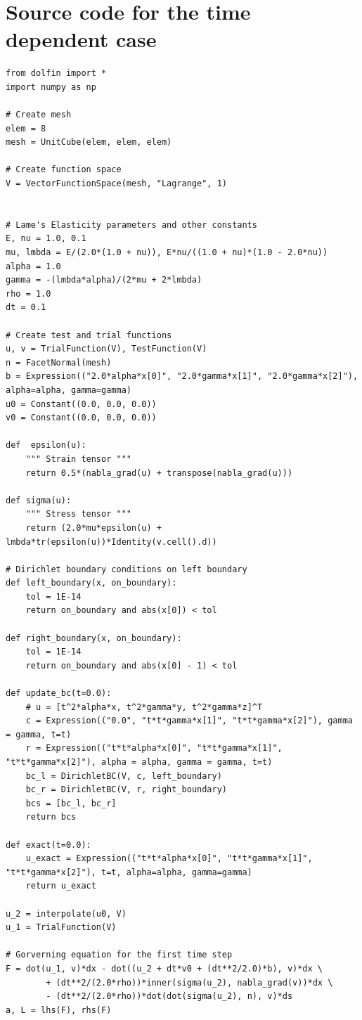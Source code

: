 \documentclass[twoside]{article}
\begin{document}
\section{Source code for the time dependent case}
\label{time}
\begin{lstlisting}
from dolfin import *
import numpy as np

# Create mesh
elem = 8
mesh = UnitCube(elem, elem, elem)

# Create function space
V = VectorFunctionSpace(mesh, "Lagrange", 1)


# Lame's Elasticity parameters and other constants
E, nu = 1.0, 0.1
mu, lmbda = E/(2.0*(1.0 + nu)), E*nu/((1.0 + nu)*(1.0 - 2.0*nu))
alpha = 1.0
gamma = -(lmbda*alpha)/(2*mu + 2*lmbda)
rho = 1.0
dt = 0.1

# Create test and trial functions
u, v = TrialFunction(V), TestFunction(V)
n = FacetNormal(mesh)
b = Expression(("2.0*alpha*x[0]", "2.0*gamma*x[1]", "2.0*gamma*x[2]"), alpha=alpha, gamma=gamma)
u0 = Constant((0.0, 0.0, 0.0))
v0 = Constant((0.0, 0.0, 0.0))

def  epsilon(u):
	""" Strain tensor """
	return 0.5*(nabla_grad(u) + transpose(nabla_grad(u)))

def sigma(u):
	""" Stress tensor """
	return (2.0*mu*epsilon(u) + lmbda*tr(epsilon(u))*Identity(v.cell().d))

# Dirichlet boundary conditions on left boundary
def left_boundary(x, on_boundary):
	tol = 1E-14
	return on_boundary and abs(x[0]) < tol

def right_boundary(x, on_boundary):
	tol = 1E-14
	return on_boundary and abs(x[0] - 1) < tol

def update_bc(t=0.0):
	# u = [t^2*alpha*x, t^2*gamma*y, t^2*gamma*z]^T
	c = Expression(("0.0", "t*t*gamma*x[1]", "t*t*gamma*x[2]"), gamma = gamma, t=t)
	r = Expression(("t*t*alpha*x[0]", "t*t*gamma*x[1]", "t*t*gamma*x[2]"), alpha = alpha, gamma = gamma, t=t)
	bc_l = DirichletBC(V, c, left_boundary)
	bc_r = DirichletBC(V, r, right_boundary)
	bcs = [bc_l, bc_r]
	return bcs

def exact(t=0.0):
	u_exact = Expression(("t*t*alpha*x[0]", "t*t*gamma*x[1]", "t*t*gamma*x[2]"), t=t, alpha=alpha, gamma=gamma)
	return u_exact

u_2 = interpolate(u0, V)
u_1 = TrialFunction(V)

# Gorverning equation for the first time step
F = dot(u_1, v)*dx - dot((u_2 + dt*v0 + (dt**2/2.0)*b), v)*dx \
		+ (dt**2/(2.0*rho))*inner(sigma(u_2), nabla_grad(v))*dx \
		- (dt**2/(2.0*rho))*dot(dot(sigma(u_2), n), v)*ds
a, L = lhs(F), rhs(F)


\end{lstlisting}
\end{document}
